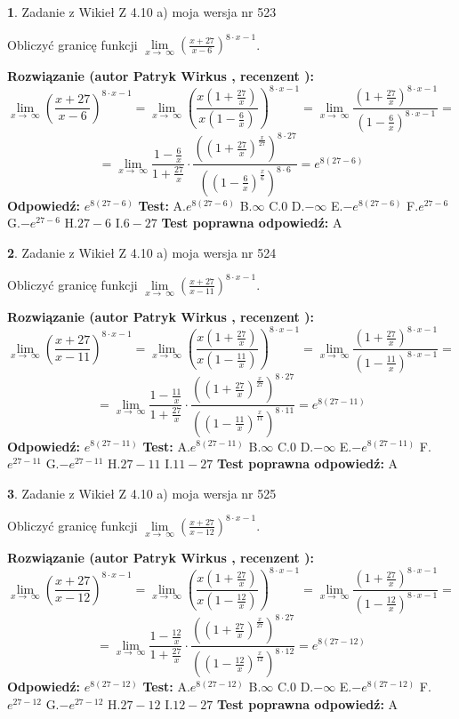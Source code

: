 \documentclass[12pt, a4paper]{article}
\theoremstyle{definition} %
\newtheorem{zad}{}
\newcommand{\zadStart}[1]{\begin{zad}#1\newline}
\newcommand{\zadStop}{\end{zad}}
\newcommand{\rozwStart}[2]{\noindent \textbf{Rozwiązanie (autor #1 , recenzent #2): }\newline}
\newcommand{\rozwStop}{\newline}
\newcommand{\odpStart}{\noindent \textbf{Odpowiedź:}\newline}
\newcommand{\odpStop}{\newline}
\newcommand{\testStart}{\noindent \textbf{Test:}\newline}
\newcommand{\testStop}{\newline}
\newcommand{\kluczStart}{\noindent \textbf{Test poprawna odpowiedź:}\newline}
\newcommand{\kluczStop}{\newline}
\begin{document}
\zadStart{Zadanie z Wikieł Z 4.10 a) moja wersja nr 523}


Obliczyć granicę funkcji  $\lim\limits_{x\to\ \infty}(\frac{x+27}{x-6})^{8\cdot x-1}$.
\zadStop
\rozwStart{Patryk Wirkus}{}
$$\lim\limits_{x\to\ \infty}(\frac{x+27}{x-6})^{8\cdot x-1} = \lim\limits_{x\to\ \infty}(\frac{x(1+\frac{27}{x})}{x(1-\frac{6}{x})})^{8\cdot x-1}=\lim\limits_{x\to\ \infty}\frac{(1+\frac{27}{x})^{8\cdot x-1}}{(1-\frac{6}{x})^{8\cdot x-1}}=$$
$$=\lim\limits_{x\to\ \infty}\frac{1-\frac{6}{x}}{1+\frac{27}{x}}\cdot\frac{((1+\frac{27}{x})^{\frac{x}{27}})^{8\cdot27}}{((1-\frac{6}{x})^{\frac{x}{6}})^{8\cdot6}}=e^{8(27-6)}$$
\rozwStop
\odpStart
$e^{8(27-6)}$
\odpStop
\testStart
A.$e^{8(27-6)}$ B.$\infty$ C.$0$ D.$-\infty$ E.$-e^{8(27-6)}$
F.$e^{27-6}$ G.$-e^{27-6}$
H.$27-6$
I.$6-27$
\testStop
\kluczStart
A
\kluczStop



\zadStart{Zadanie z Wikieł Z 4.10 a) moja wersja nr 524}


Obliczyć granicę funkcji  $\lim\limits_{x\to\ \infty}(\frac{x+27}{x-11})^{8\cdot x-1}$.
\zadStop
\rozwStart{Patryk Wirkus}{}
$$\lim\limits_{x\to\ \infty}(\frac{x+27}{x-11})^{8\cdot x-1} = \lim\limits_{x\to\ \infty}(\frac{x(1+\frac{27}{x})}{x(1-\frac{11}{x})})^{8\cdot x-1}=\lim\limits_{x\to\ \infty}\frac{(1+\frac{27}{x})^{8\cdot x-1}}{(1-\frac{11}{x})^{8\cdot x-1}}=$$
$$=\lim\limits_{x\to\ \infty}\frac{1-\frac{11}{x}}{1+\frac{27}{x}}\cdot\frac{((1+\frac{27}{x})^{\frac{x}{27}})^{8\cdot27}}{((1-\frac{11}{x})^{\frac{x}{11}})^{8\cdot11}}=e^{8(27-11)}$$
\rozwStop
\odpStart
$e^{8(27-11)}$
\odpStop
\testStart
A.$e^{8(27-11)}$ B.$\infty$ C.$0$ D.$-\infty$ E.$-e^{8(27-11)}$
F.$e^{27-11}$ G.$-e^{27-11}$
H.$27-11$
I.$11-27$
\testStop
\kluczStart
A
\kluczStop



\zadStart{Zadanie z Wikieł Z 4.10 a) moja wersja nr 525}


Obliczyć granicę funkcji  $\lim\limits_{x\to\ \infty}(\frac{x+27}{x-12})^{8\cdot x-1}$.
\zadStop
\rozwStart{Patryk Wirkus}{}
$$\lim\limits_{x\to\ \infty}(\frac{x+27}{x-12})^{8\cdot x-1} = \lim\limits_{x\to\ \infty}(\frac{x(1+\frac{27}{x})}{x(1-\frac{12}{x})})^{8\cdot x-1}=\lim\limits_{x\to\ \infty}\frac{(1+\frac{27}{x})^{8\cdot x-1}}{(1-\frac{12}{x})^{8\cdot x-1}}=$$
$$=\lim\limits_{x\to\ \infty}\frac{1-\frac{12}{x}}{1+\frac{27}{x}}\cdot\frac{((1+\frac{27}{x})^{\frac{x}{27}})^{8\cdot27}}{((1-\frac{12}{x})^{\frac{x}{12}})^{8\cdot12}}=e^{8(27-12)}$$
\rozwStop
\odpStart
$e^{8(27-12)}$
\odpStop
\testStart
A.$e^{8(27-12)}$ B.$\infty$ C.$0$ D.$-\infty$ E.$-e^{8(27-12)}$
F.$e^{27-12}$ G.$-e^{27-12}$
H.$27-12$
I.$12-27$
\testStop
\kluczStart
A
\kluczStop
\end{document}
